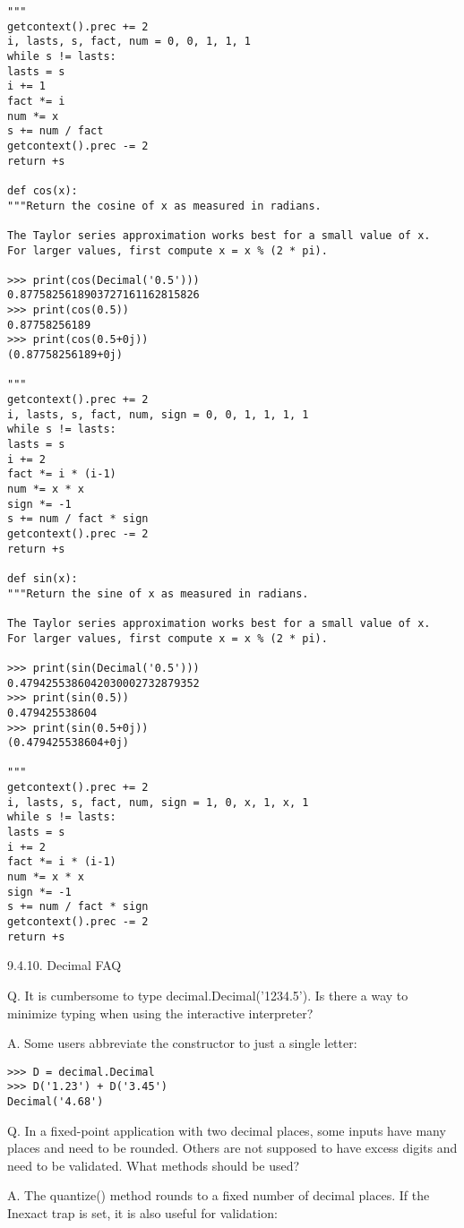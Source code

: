 \begin{lstlisting}
"""
getcontext().prec += 2
i, lasts, s, fact, num = 0, 0, 1, 1, 1
while s != lasts:
lasts = s
i += 1
fact *= i
num *= x
s += num / fact
getcontext().prec -= 2
return +s

def cos(x):
"""Return the cosine of x as measured in radians.

The Taylor series approximation works best for a small value of x.
For larger values, first compute x = x % (2 * pi).

>>> print(cos(Decimal('0.5')))
0.8775825618903727161162815826
>>> print(cos(0.5))
0.87758256189
>>> print(cos(0.5+0j))
(0.87758256189+0j)

"""
getcontext().prec += 2
i, lasts, s, fact, num, sign = 0, 0, 1, 1, 1, 1
while s != lasts:
lasts = s
i += 2
fact *= i * (i-1)
num *= x * x
sign *= -1
s += num / fact * sign
getcontext().prec -= 2
return +s

def sin(x):
"""Return the sine of x as measured in radians.

The Taylor series approximation works best for a small value of x.
For larger values, first compute x = x % (2 * pi).

>>> print(sin(Decimal('0.5')))
0.4794255386042030002732879352
>>> print(sin(0.5))
0.479425538604
>>> print(sin(0.5+0j))
(0.479425538604+0j)

"""
getcontext().prec += 2
i, lasts, s, fact, num, sign = 1, 0, x, 1, x, 1
while s != lasts:
lasts = s
i += 2
fact *= i * (i-1)
num *= x * x
sign *= -1
s += num / fact * sign
getcontext().prec -= 2
return +s
\end{lstlisting}


9.4.10. Decimal FAQ

Q. It is cumbersome to type decimal.Decimal('1234.5'). Is there a way to minimize typing when using the interactive interpreter?

A. Some users abbreviate the constructor to just a single letter:

\begin{lstlisting}
>>> D = decimal.Decimal
>>> D('1.23') + D('3.45')
Decimal('4.68')
\end{lstlisting}

Q. In a fixed-point application with two decimal places, some inputs have many places and need to be rounded. Others are not supposed to have excess digits and need to be validated. What methods should be used?

A. The quantize() method rounds to a fixed number of decimal places. If the Inexact trap is set, it is also useful for validation:

